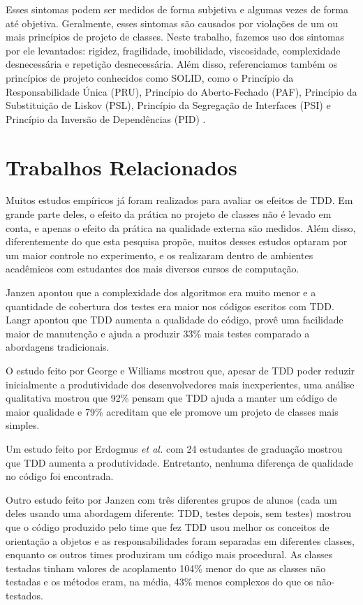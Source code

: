 \documentclass[conference]{IEEEtran}
\begin{document}
Esses sintomas podem ser medidos de forma subjetiva e algumas vezes de forma 
até objetiva. Geralmente, esses sintomas são causados por violações de um ou 
mais princípios de projeto de classes.
Neste trabalho, fazemos uso dos sintomas por ele levantados: rigidez, fragilidade, imobilidade, 
viscosidade, complexidade desnecessária e repetição desnecessária. Além disso, referenciamos também
os princípios de projeto conhecidos como SOLID, 
como o Princípio da Responsabilidade Única (PRU), Princípio do Aberto-Fechado (PAF),
Princípio da Substituição de Liskov (PSL), Princípio da Segregação de Interfaces (PSI) e Princípio da
Inversão de Dependências (PID) \cite{bob-martin}.

\section{Trabalhos Relacionados}
\label{cap:trabalhos-relacionados}

Muitos estudos empíricos já foram realizados para avaliar os efeitos de TDD.
Em grande parte deles, o efeito da prática no projeto de classes não é 
levado em conta, e apenas o efeito da prática na qualidade externa são medidos.
Além disso, diferentemente
do que esta pesquisa propõe, muitos desses estudos optaram por um
maior controle no experimento, e os realizaram dentro de ambientes acadêmicos 
com estudantes dos mais diversos cursos de computação.

Janzen \cite{janzen-arch-improvement} 
apontou que a complexidade dos algoritmos era muito menor e a quantidade de
cobertura dos testes era maior nos códigos escritos com TDD.
Langr \cite{langr} apontou que TDD aumenta a qualidade do código, provê uma 
facilidade maior de manutenção e ajuda a produzir 33\% mais testes comparado a
abordagens tradicionais.

O estudo feito por George e Williams \cite{george-e-williams} mostrou que,
apesar de TDD poder reduzir inicialmente a produtividade dos desenvolvedores 
mais inexperientes, uma análise
qualitativa mostrou que 92\% pensam que TDD ajuda a manter um
código de maior qualidade e 79\% acreditam que ele promove um projeto 
de classes mais simples.

Um estudo feito por Erdogmus \textit{et al.} \cite{erdogmus-morisio} com 24 estudantes de
graduação mostrou que TDD aumenta a produtividade. Entretanto, nenhuma diferença 
de qualidade no código foi encontrada.

Outro estudo feito por Janzen \cite{janzen-saiedian} com três diferentes grupos
de alunos (cada um deles usando uma abordagem diferente: TDD, testes depois, sem
testes) mostrou que o código produzido pelo time que fez TDD usou melhor os
conceitos de orientação a objetos e as responsabilidades foram separadas em 
diferentes classes, enquanto os outros times produziram um código mais
procedural. 
As classes testadas tinham valores de acoplamento 104\% menor do 
que as classes não testadas e os métodos eram, na média, 43\% menos complexos 
do que os não-testados.
\end{document}
